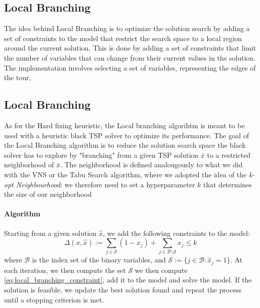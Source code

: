 \documentclass{article}
\begin{document}
\subsection{Local Branching}
The idea behind Local Branching is to optimize the solution search by adding a set of constraints to the model that restrict the search space to a local region around the current solution.
This is done by adding a set of constraints that limit the number of variables that can change from their current values in the solution.
The implementation involves selecting a set of variables, representing the edges of the tour, 

\subsection{Local Branching}
As for the Hard fixing heuristic, the Local branching algorihtm is meant to be used with a heuristic black TSP solver to optimize its performance.
The goal of the Local Branching algorithm is to reduce the solution search space the black solver has to explore by "branching" from a given TSP solution $\bar{x}$ to a restricted neighborhood of $\bar{x}$.
The neighborhood is defined analougously to what we did with the VNS or the Tabu Search algorithm, where we adopted the idea of the \textit{k-opt Neighbourhood}: we therefore need to set a hyperparameter $k$
that determines the size of our neighborhood\cite{Fischetti2003LocalBranching}

\paragraph{Algorithm}
Starting from a given solution $\hat{x}$, we add the following constraints to the model:
\begin{equation}
	\Delta(x , \hat{x}) := \sum_{j \in \mathcal{S}} (1 - x_j) + \sum_{j \in \mathcal{B} \setminus \mathcal{S}} x_j \leq k
	\label{eq:local_branching_constraint}
\end{equation} 
where $\mathcal{B}$ is the index set of the binary variables, and $\mathcal{S} := \{ j \in \mathcal{B} : \hat{x}_j = 1\}$\cite{Fischetti2003LocalBranching}.  
At each iteration, we then compute the set $\mathcal{S}$ we then compute \ref{eq:local_branching_constraint}, add it to the model and solve the model.
If the solution is feasible, we update the best solution found and repeat the process until a stopping criterion is met.
\end{document}
